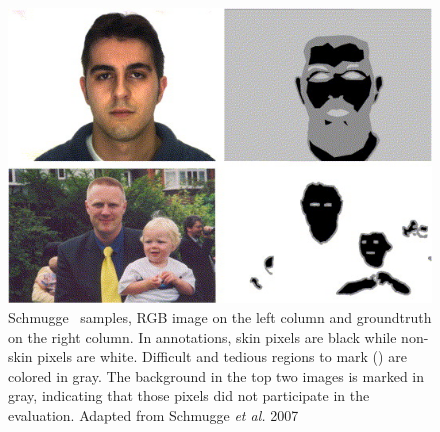 \begin{figure}[hb]
    \centering
    \includegraphics[width=0.7\linewidth]{images/datasets/schmugge_sample.jpg}
    \caption{Schmugge~\cite{schmugge2007objective} samples, RGB image on the left column and groundtruth on the right column. In annotations, skin pixels are black while non-skin pixels are white.
    Difficult and tedious regions to mark () are colored in gray.
    The background in the top two images is marked in gray, indicating that those pixels did not participate in the evaluation. Adapted from Schmugge \textit{et al.} 2007~\cite{schmugge2007objective}}
    \label{fig:schmugge-ternary}
\end{figure}
